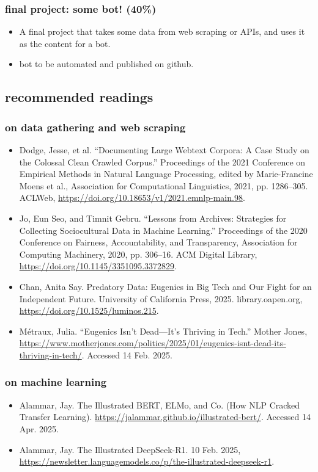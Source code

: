\documentclass[11pt]{article}
\begin{document}
\subsubsection{final project: some bot! (40\%)}
\label{sec:org67e1a46}
\begin{itemize}
\item A final project that takes some data from web scraping or APIs, and
uses it as the content for a bot.
\item bot to be automated and published on github.
\end{itemize}

\subsection{recommended readings}
\label{sec:org0e7001c}
\subsubsection{on data gathering and web scraping}
\label{sec:org24293ca}
\begin{itemize}
\item Dodge, Jesse, et al. “Documenting Large Webtext Corpora: A Case
Study on the Colossal Clean Crawled Corpus.” Proceedings of the 2021
Conference on Empirical Methods in Natural Language Processing,
edited by Marie-Francine Moens et al., Association for Computational
Linguistics, 2021, pp. 1286–305. ACLWeb,
\url{https://doi.org/10.18653/v1/2021.emnlp-main.98}.
\item Jo, Eun Seo, and Timnit Gebru. “Lessons from Archives: Strategies
for Collecting Sociocultural Data in Machine Learning.” Proceedings
of the 2020 Conference on Fairness, Accountability, and
Transparency, Association for Computing Machinery, 2020, pp. 306–16.
ACM Digital Library, \url{https://doi.org/10.1145/3351095.3372829}.
\item Chan, Anita Say. Predatory Data: Eugenics in Big Tech and Our Fight
for an Independent Future. University of California Press, 2025.
library.oapen.org, \url{https://doi.org/10.1525/luminos.215}.
\item Métraux, Julia. “Eugenics Isn’t Dead—It’s Thriving in Tech.” Mother
Jones,
\url{https://www.motherjones.com/politics/2025/01/eugenics-isnt-dead-its-thriving-in-tech/}.
Accessed 14 Feb. 2025.
\end{itemize}

\subsubsection{on machine learning}
\label{sec:orgb559504}
\begin{itemize}
\item Alammar, Jay. The Illustrated BERT, ELMo, and Co. (How NLP Cracked
Transfer Learning). \url{https://jalammar.github.io/illustrated-bert/}.
Accessed 14 Apr. 2025.
\item Alammar, Jay. The Illustrated DeepSeek-R1. 10 Feb. 2025,
\url{https://newsletter.languagemodels.co/p/the-illustrated-deepseek-r1}.
\end{itemize}
\end{document}
